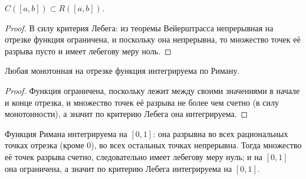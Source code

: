 \begin{corollary}
    $C([a, b]) \subset R([a, b])$.
\end{corollary}
\begin{proof}
    В силу критерия Лебега: из теоремы Вейерштрасса непрерывная на отрезке функция ограничена, и поскольку она непрерывна, то множество точек её разрыва пусто и имеет лебегову меру ноль.
\end{proof}

\begin{corollary}
    Любая монотонная на отрезке функция интегрируема по Риману.
\end{corollary}
\begin{proof}
    Функция ограничена, поскольку лежит между своими значениями в начале и конце отрезка, и множество точек её разрыва не более чем счетно (в силу монотонности), а значит по критерию Лебега она интегрируема.
\end{proof}
\begin{example}
    Функция Римана интегрируема на $[0, 1]$: она разрывна во всех рациональных точках отрезка (кроме $0$), во всех остальных точках непрерывна. Тогда множество её точек разрыва счетно, следовательно имеет лебегову меру нуль; и на $[0, 1]$ она ограничена, а значит по критерию Лебега интегрируема на $[0, 1]$.
\end{example}